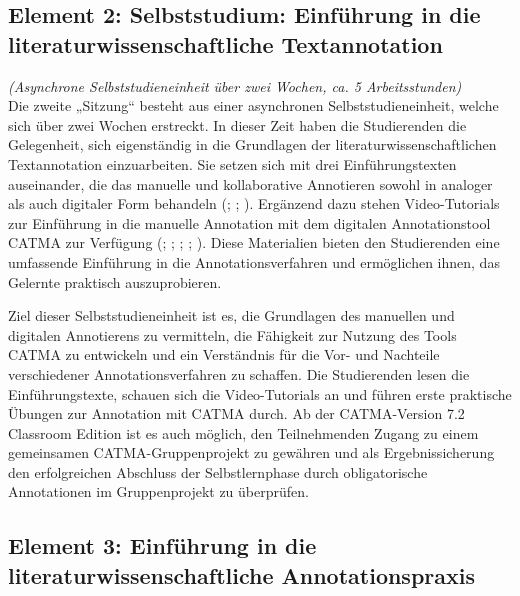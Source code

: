\documentclass[
          a4paper,
        ]{article}
\begin{document}
\subsection{Element 2: Selbststudium: Einführung in die
literaturwissenschaftliche
Textannotation}\label{element-2-selbststudium-einfuxfchrung-in-die-literaturwissenschaftliche-textannotation}

\emph{(Asynchrone Selbststudieneinheit über zwei Wochen, ca. 5
Arbeitsstunden)}\\
Die zweite „Sitzung`` besteht aus einer asynchronen
Selbststudieneinheit, welche sich über zwei Wochen erstreckt. In dieser
Zeit haben die Studierenden die Gelegenheit, sich eigenständig in die
Grundlagen der literaturwissenschaftlichen Textannotation einzuarbeiten.
Sie setzen sich mit drei Einführungstexten auseinander, die das manuelle
und kollaborative Annotieren sowohl in analoger als auch digitaler Form
behandeln (; ;
). Ergänzend dazu stehen Video-Tutorials zur Einführung in die
manuelle Annotation mit dem digitalen Annotationstool CATMA zur
Verfügung (;
;
;
;
). Diese
Materialien bieten den Studierenden eine umfassende Einführung in die
Annotationsverfahren und ermöglichen ihnen, das Gelernte praktisch
auszuprobieren.

Ziel dieser Selbststudieneinheit ist es, die Grundlagen des manuellen
und digitalen Annotierens zu vermitteln, die Fähigkeit zur Nutzung des
Tools CATMA zu entwickeln und ein Verständnis für die Vor- und Nachteile
verschiedener Annotationsverfahren zu schaffen. Die Studierenden lesen
die Einführungstexte, schauen sich die Video-Tutorials an und führen
erste praktische Übungen zur Annotation mit CATMA durch. Ab der
CATMA-Version 7.2 Classroom Edition ist es auch möglich, den
Teilnehmenden Zugang zu einem gemeinsamen CATMA-Gruppenprojekt zu
gewähren und als Ergebnissicherung den erfolgreichen Abschluss der
Selbstlernphase durch obligatorische Annotationen im Gruppenprojekt zu
überprüfen.

\subsection{Element 3: Einführung in die literaturwissenschaftliche
Annotationspraxis}\label{element-3-einfuxfchrung-in-die-literaturwissenschaftliche-annotationspraxis}
\end{document}

